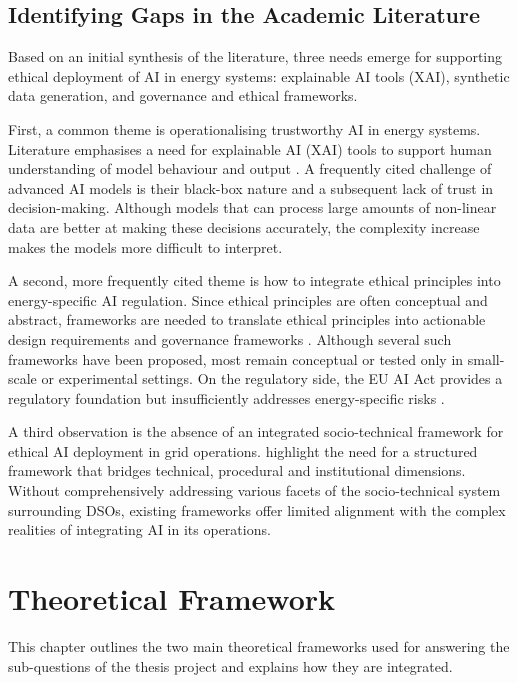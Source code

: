\section{Identifying Gaps in the Academic Literature}
\label{sec:gaps}

Based on an initial synthesis of the literature, three needs emerge for supporting ethical deployment of AI in energy systems: explainable AI tools (XAI), synthetic data generation, and governance and ethical frameworks.

First, a common theme is operationalising trustworthy AI in energy systems. Literature emphasises a need for explainable AI (XAI) tools to support human understanding of model behaviour and output \autocite{Shadi2025, Panagoulias2023, Kobayashi2023}. A frequently cited challenge of advanced AI models is their black-box nature and a subsequent lack of trust in decision-making. Although models that can process large amounts of non-linear data are better at making these decisions accurately, the complexity increase makes the models more difficult to interpret.

A second, more frequently cited theme is how to integrate ethical principles into energy-specific AI regulation. Since ethical principles are often conceptual and abstract, frameworks are needed to translate ethical principles into actionable design requirements and governance frameworks \autocite{ElHaber2024, Noorman2023, Knox2022}. Although several such frameworks have been proposed, most remain conceptual or tested only in small-scale or experimental settings. On the regulatory side, the EU AI Act provides a regulatory foundation but insufficiently addresses energy-specific risks \autocite{Niet2021}.

A third observation is the absence of an integrated socio-technical framework for ethical AI deployment in grid operations. \textcite{Henao2025} highlight the need for a structured framework that bridges technical, procedural and institutional dimensions. Without comprehensively addressing various facets of the socio-technical system surrounding DSOs, existing frameworks offer limited alignment with the complex realities of integrating AI in its operations.

\chapter{Theoretical Framework}
\label{ch:theory}

This chapter outlines the two main theoretical frameworks used for answering the sub-questions of the thesis project and explains how they are integrated.

